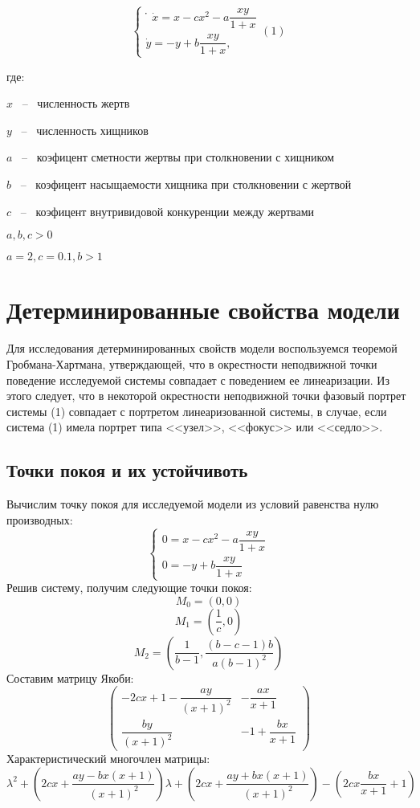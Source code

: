 \documentclass[a4paper,14pt]{extarticle}
\begin{document}
$$\begin{cases}
  ̇\dot x = x-cx^2-a\dfrac{xy}{1+x}\\
  \dot y = -y + b\dfrac{xy}{1+x},
\end{cases} (1) $$

где:

$x$ ~--~ численность жертв

$y$ ~--~ численность хищников

$a$ ~--~ коэфицент сметности жертвы при столкновении с хищником

$b$ ~--~ коэфицент насыщаемости хищника при столкновении с жертвой

$c$ ~--~ коэфицент внутривидовой конкуренции между жертвами

$a, b, c > 0$

$a=2, c=0.1, b > 1$


\newpage
\section{Детерминированные свойства модели}
Для исследования детерминированных свойств модели воспользуемся теоремой Гробмана-Хартмана, утверждающей, что в окрестности неподвижной точки поведение исследуемой системы совпадает с поведением ее линеаризации. Из этого следует, что в некоторой окрестности неподвижной точки фазовый портрет системы (1) совпадает с портретом линеаризованной системы, в случае, если система (1) имела портрет типа <<узел>>, <<фокус>> или <<седло>>.

\subsection{Точки покоя и их устойчивоть}

Вычислим точку покоя для исследуемой модели из условий равенства нулю производных:
$$\begin{cases}
  0 = x-cx^2-a\dfrac{xy}{1+x}\\
  0 = -y + b\dfrac{xy}{1+x}
\end{cases}$$
Решив систему, получим следующие точки покоя:
$$ M_0 = \left(0,0 \right) $$
$$ M_1 = \left(\dfrac{1}{c}, 0 \right) $$ 
$$ M_2 = \left(\dfrac{1}{b-1}, \dfrac{(b-c-1)b}{a(b-1)^2} \right) $$
Составим матрицу Якоби: 
$$\left(
\begin{matrix}
-2cx+1-\dfrac{ay}{(x+1)^2} & -\dfrac{ax}{x+1}\\
\dfrac{by}{(x+1)^2} & -1 + \dfrac{bx}{x+1}
\end{matrix}
\right)$$
Характеристический многочлен матрицы: 
$$ \lambda^2 + (2cx+\frac{ay-bx(x+1)}{(x+1)^2})\lambda + (2cx+\frac{ay+bx(x+1)}{(x+1)^2}) - (2cx\frac{bx}{x+1} + 1)$$
\end{document}
